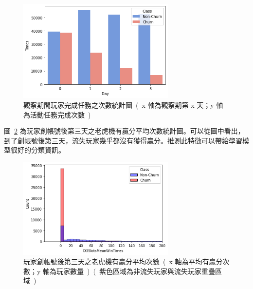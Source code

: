 \begin{figure}[!htb]
    \begin{center}
      \includegraphics[width=0.7\textwidth]{figures/evaluation/Image_DailyActivityMissionTimes.png}
      \caption[觀察期間玩家完成任務之次數統計圖]{觀察期間玩家完成任務之次數統計圖\ (\ x 軸為觀察期第 x 天；y 軸為活動任務完成次數\ )\ }
      \label{fig:eva_ValuableFeature_DailyActivityMissionTimes}
    \end{center}
\end{figure}
\newpage

圖~\ref{fig:eva_ValuableFeature_D3SlotsMeanWinTimes} 為玩家創帳號後第三天之老虎機有贏分平均次數統計圖。可以從圖中看出，到了創帳號後第三天，流失玩家幾乎都沒有獲得贏分。推測此特徵可以帶給學習模型很好的分類資訊。

\begin{figure}[!htb]
    \begin{center}
      \includegraphics[width=0.7\textwidth]{figures/evaluation/Image_D3SlotsMeanWinTimes.png}
      \caption[玩家創帳號後第三天之老虎機有贏分平均次數統計圖]{玩家創帳號後第三天之老虎機有贏分平均次數\ (\ x 軸為平均有贏分次數；y 軸為玩家數量\ )\ (\ 紫色區域為非流失玩家與流失玩家重疊區域\ )\ }
      \label{fig:eva_ValuableFeature_D3SlotsMeanWinTimes}
    \end{center}
\end{figure}

